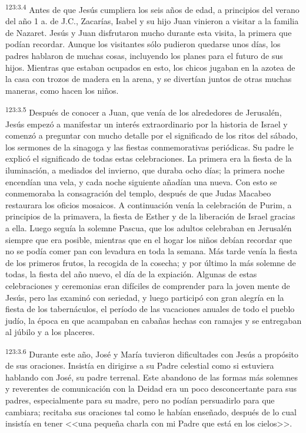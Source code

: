\par 
\textsuperscript{123:3.4} Antes de que Jesús cumpliera los seis años de edad, a principios del verano del año 1 a. de J.C., Zacarías, Isabel y su hijo Juan vinieron a visitar a la familia de Nazaret. Jesús y Juan disfrutaron mucho durante esta visita, la primera que podían recordar. Aunque los visitantes sólo pudieron quedarse unos días, los padres hablaron de muchas cosas, incluyendo los planes para el futuro de sus hijos. Mientras que estaban ocupados en esto, los chicos jugaban en la azotea de la casa con trozos de madera en la arena, y se divertían juntos de otras muchas maneras, como hacen los niños.

\par 
\textsuperscript{123:3.5} Después de conocer a Juan, que venía de los alrededores de Jerusalén, Jesús empezó a manifestar un interés extraordinario por la historia de Israel y comenzó a preguntar con mucho detalle por el significado de los ritos del sábado, los sermones de la sinagoga y las fiestas conmemorativas periódicas. Su padre le explicó el significado de todas estas celebraciones. La primera era la fiesta de la iluminación, a mediados del invierno, que duraba ocho días; la primera noche encendían una vela, y cada noche siguiente añadían una nueva. Con esto se conmemoraba la consagración del templo, después de que Judas Macabeo restaurara los oficios mosaicos. A continuación venía la celebración de Purim, a principios de la primavera, la fiesta de Esther y de la liberación de Israel gracias a ella. Luego seguía la solemne Pascua, que los adultos celebraban en Jerusalén siempre que era posible, mientras que en el hogar los niños debían recordar que no se podía comer pan con levadura en toda la semana. Más tarde venía la fiesta de los primeros frutos, la recogida de la cosecha; y por último la más solemne de todas, la fiesta del año nuevo, el día de la expiación. Algunas de estas celebraciones y ceremonias eran difíciles de comprender para la joven mente de Jesús, pero las examinó con seriedad, y luego participó con gran alegría en la fiesta de los tabernáculos, el período de las vacaciones anuales de todo el pueblo judío, la época en que acampaban en cabañas hechas con ramajes y se entregaban al júbilo y a los placeres.

\par 
\textsuperscript{123:3.6} Durante este año, José y María tuvieron dificultades con Jesús a propósito de sus oraciones. Insistía en dirigirse a su Padre celestial como si estuviera hablando con José, su padre terrenal. Este abandono de las formas más solemnes y reverentes de comunicación con la Deidad era un poco desconcertante para sus padres, especialmente para su madre, pero no podían persuadirlo para que cambiara; recitaba sus oraciones tal como le habían enseñado, después de lo cual insistía en tener <<una pequeña charla con mi Padre que está en los cielos>>.


